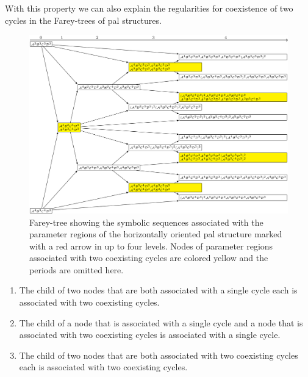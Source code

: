 With this property we can also explain the regularities for coexistence of two cycles in the Farey-trees of \gls{pal} structures.

\clearpage

\begin{figure}
	\centering
	\includegraphics[width=.7 \textwidth]{../Figures/7/7.21/adding.png}
	\caption[Farey-tree showing the symbolic sequences associated with the parameter regions of a horizontally oriented  structure]{
		Farey-tree showing the symbolic sequences associated with the parameter regions of the horizontally oriented \gls{pal} structure marked with a red arrow in  up to four levels.
		Nodes of parameter regions associated with two coexisting cycles are colored yellow and the periods are omitted here.
	}
	\label{fig:add.prop.hor.tree}
\end{figure}

\begin{theorem}
	\label{theorem:child.coexistence}
	\begin{enumerate}
		\item The child of two nodes that are both associated with a single cycle each is associated with two coexisting cycles.
		\item The child of a node that is associated with a single cycle and a node that is associated with two coexisting cycles is associated with a single cycle.
		\item The child of two nodes that are both associated with two coexisting cycles each is associated with two coexisting cycles.
	\end{enumerate}
\end{theorem}

